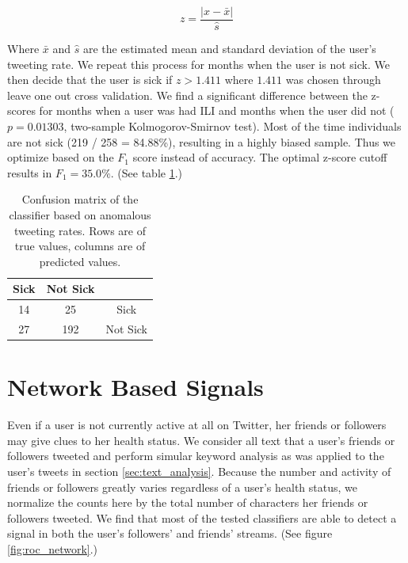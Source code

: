 \documentclass{acm_proc_article-sp}
\begin{document}
\begin{equation}
z = \frac{|x - \bar{x}|}{\hat{s}}
\end{equation}

Where \(\bar{x}\) and \(\hat{s}\) are the estimated mean and standard deviation of the user's tweeting rate. \cite{Grubs:1969ab} We repeat this process for months when the user is not sick. We then decide that the user is sick if \(z > 1.411\) where \(1.411\) was chosen through leave one out cross validation. We find a significant difference between the z-scores for months when a user was had ILI and months when the user did not (\(p = 0.01303\), two-sample Kolmogorov-Smirnov test). Most of the time individuals are not sick (219 / 258 = 84.88\%), resulting in a highly biased sample. Thus we optimize based on the \(F_1\) score instead of accuracy. The optimal z-score cutoff results in \(F_1= 35.0\%\). (See table \ref{tab:tweet_anomaly_confusion}.) 


\begin{table}
\centering
\begin{tabular}{|c|c|c|} \hline
Sick&Not Sick&\ \\ \hline
14 & 25 & Sick\\ \hline
27 & 192 & Not Sick\\
\hline\end{tabular}
\caption{Confusion matrix of the classifier based on anomalous tweeting rates. Rows are of true values, columns are of predicted values.}
\label{tab:tweet_anomaly_confusion}
\end{table}

\section{Network Based Signals}

Even if a user is not currently active at all on Twitter, her friends or followers may give clues to her health status. We consider all text that a user's friends or followers tweeted and perform simular keyword analysis as was applied to the user's tweets in section \ref{sec:text_analysis}. Because the number and activity of friends or followers greatly varies regardless of a user's health status, we normalize the counts here by the total number of characters her friends or followers tweeted. We find that most of the tested classifiers are able to detect a signal in both the user's followers' and friends' streams. (See figure \ref{fig:roc_network}.)
\end{document}
